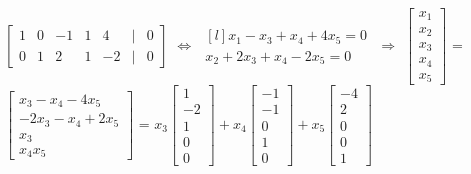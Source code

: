\begin{tbox}
        \scriptsize
        $\begin{bmatrix}
            1 & 0 & -1 & 1 & 4 & | & 0 \\
            0 & 1 & 2 & 1 & -2 & | & 0
        \end{bmatrix}$
        $\Leftrightarrow$
        $\begin{matrix*}[l]
            x_1 - x_3 + x_4 + 4x_5 = 0 \\
            x_2 + 2x_3 + x_4 - 2x_5 = 0
        \end{matrix*}$
        $\Rightarrow$
        $\begin{bmatrix}
            x_1 \\
            x_2 \\
            x_3 \\
            x_4 \\
            x_5
        \end{bmatrix}$ =
        $\begin{bmatrix}
            x_3 - x_4 - 4x_5 \\
            -2x_3 - x_4 + 2x_5 \\
            x_3 \\
            x_4
            x_5 
        \end{bmatrix}$ =
        $x_3\begin{bmatrix}
            1 \\
            -2 \\
            1 \\
            0 \\
            0
        \end{bmatrix} +
        x_4\begin{bmatrix}
            -1 \\
            -1 \\
            0 \\
            1 \\
            0
        \end{bmatrix}  +
        x_5\begin{bmatrix}
            -4 \\
            2 \\
            0 \\
            0 \\
            1
        \end{bmatrix}$
        \normalsize


\end{tbox}
